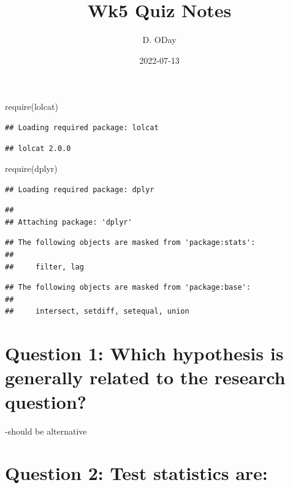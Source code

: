 \documentclass[
]{article}
\title{Wk5 Quiz Notes}
\author{D. ODay}
\date{2022-07-13}
\newenvironment{Shaded}{\begin{snugshade}}{\end{snugshade}}
\newcommand{\FunctionTok}[1]{\textcolor[rgb]{0.00,0.00,0.00}{#1}}
\newcommand{\NormalTok}[1]{#1}
\begin{document}
\maketitle

\begin{Shaded}
\begin{Highlighting}[]
\FunctionTok{require}\NormalTok{(lolcat)}
\end{Highlighting}
\end{Shaded}

\begin{verbatim}
## Loading required package: lolcat
\end{verbatim}

\begin{verbatim}
## lolcat 2.0.0
\end{verbatim}

\begin{Shaded}
\begin{Highlighting}[]
\FunctionTok{require}\NormalTok{(dplyr)}
\end{Highlighting}
\end{Shaded}

\begin{verbatim}
## Loading required package: dplyr
\end{verbatim}

\begin{verbatim}
## 
## Attaching package: 'dplyr'
\end{verbatim}

\begin{verbatim}
## The following objects are masked from 'package:stats':
## 
##     filter, lag
\end{verbatim}

\begin{verbatim}
## The following objects are masked from 'package:base':
## 
##     intersect, setdiff, setequal, union
\end{verbatim}

\hypertarget{question-1-which-hypothesis-is-generally-related-to-the-research-question}{%
\section{Question 1: Which hypothesis is generally related to the
research
question?}\label{question-1-which-hypothesis-is-generally-related-to-the-research-question}}

-should be alternative

\hypertarget{question-2-test-statistics-are}{%
\section{Question 2: Test statistics
are:}\label{question-2-test-statistics-are}}
\end{document}

